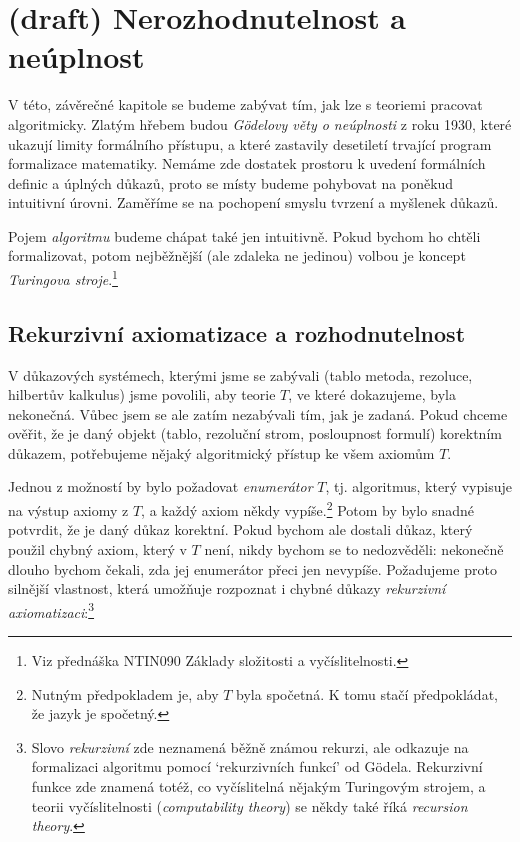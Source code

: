 \chapter{(draft) Nerozhodnutelnost a neúplnost}

V této, závěrečné kapitole se budeme zabývat tím, jak lze s teoriemi pracovat algoritmicky. Zlatým hřebem budou \emph{Gödelovy věty o neúplnosti} z roku 1930, které ukazují limity formálního přístupu, a které zastavily desetiletí trvající program formalizace matematiky. Nemáme zde dostatek prostoru k uvedení formálních definic a úplných důkazů, proto se místy budeme pohybovat na poněkud intuitivní úrovni. Zaměříme se na pochopení smyslu tvrzení a myšlenek důkazů.

Pojem \emph{algoritmu} budeme chápat také jen intuitivně. Pokud bychom ho chtěli formalizovat, potom nejběžnější (ale zdaleka ne jedinou) volbou je koncept \emph{Turingova stroje}.\footnote{Viz přednáška NTIN090 Základy složitosti a vyčíslitelnosti.}

\section{Rekurzivní axiomatizace a rozhodnutelnost}

V důkazových systémech, kterými jsme se zabývali (tablo metoda, rezoluce, hilbertův kalkulus) jsme povolili, aby teorie $T$, ve které dokazujeme, byla nekonečná. Vůbec jsem se ale zatím nezabývali tím, jak je zadaná. Pokud chceme ověřit, že je daný objekt (tablo, rezoluční strom, posloupnost formulí) korektním důkazem, potřebujeme nějaký algoritmický přístup ke všem axiomům $T$. 

Jednou z možností by bylo požadovat \emph{enumerátor} $T$, tj. algoritmus, který vypisuje na výstup axiomy z $T$, a každý axiom někdy vypíše.\footnote{Nutným předpokladem je, aby $T$ byla spočetná. K tomu stačí předpokládat, že jazyk je spočetný.} Potom by bylo snadné potvrdit, že je daný důkaz korektní. Pokud bychom ale dostali důkaz, který použil chybný axiom, který v $T$ není, nikdy bychom se to nedozvěděli: nekonečně dlouho bychom čekali, zda jej enumerátor přeci jen nevypíše. Požadujeme proto silnější vlastnost, která umožňuje rozpoznat i chybné důkazy \emph{rekurzivní axiomatizaci}:\footnote{Slovo \emph{rekurzivní} zde neznamená běžně známou rekurzi, ale odkazuje na formalizaci algoritmu pomocí `rekurzivních funkcí' od Gödela. Rekurzivní funkce zde znamená totéž, co vyčíslitelná nějakým Turingovým strojem, a teorii vyčíslitelnosti (\emph{computability theory}) se někdy také říká \emph{recursion theory}.}

